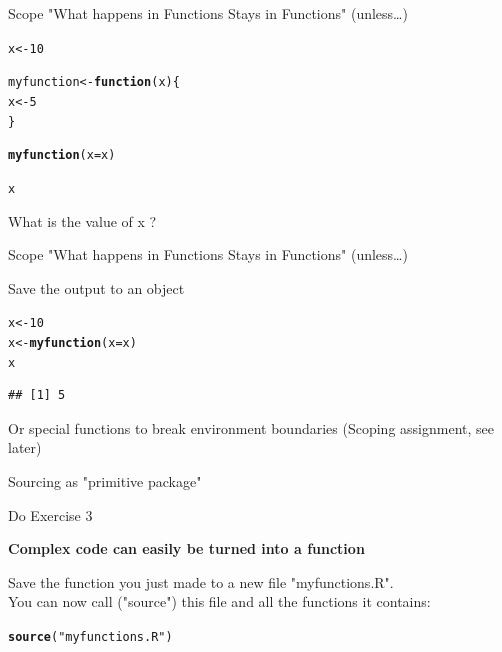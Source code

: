 \documentclass{beamer}\usepackage[]{graphicx}\usepackage[]{color}
\makeatletter
\newcommand{\hlnum}[1]{\textcolor[rgb]{0.686,0.059,0.569}{#1}}%
\newcommand{\hlstr}[1]{\textcolor[rgb]{0.192,0.494,0.8}{#1}}%
\newcommand{\hlstd}[1]{\textcolor[rgb]{0.345,0.345,0.345}{#1}}%
\newcommand{\hlkwa}[1]{\textcolor[rgb]{0.161,0.373,0.58}{\textbf{#1}}}%
\newcommand{\hlkwb}[1]{\textcolor[rgb]{0.69,0.353,0.396}{#1}}%
\newcommand{\hlkwc}[1]{\textcolor[rgb]{0.333,0.667,0.333}{#1}}%
\newcommand{\hlkwd}[1]{\textcolor[rgb]{0.737,0.353,0.396}{\textbf{#1}}}%
\newenvironment{kframe}{%
 \def\at@end@of@kframe{}%
 \ifinner\ifhmode%
  \def\at@end@of@kframe{\end{minipage}}%
  \begin{minipage}{\columnwidth}%
 \fi\fi%
 \def\FrameCommand##1{\hskip\@totalleftmargin \hskip-\fboxsep
 \colorbox{shadecolor}{##1}\hskip-\fboxsep
     \hskip-\linewidth \hskip-\@totalleftmargin \hskip\columnwidth}%
 \MakeFramed {\advance\hsize-\width
   \@totalleftmargin\z@ \linewidth\hsize
   \@setminipage}}%
 {\par\unskip\endMakeFramed%
 \at@end@of@kframe}
\newenvironment{knitrout}{}{} %
\makeatother
\begin{document}
\begin{frame}{Scope}
"What happens in Functions Stays in Functions" (unless\dots)

\begin{knitrout}
\color{fgcolor}\begin{kframe}
\begin{alltt}
\hlstd{x} \hlkwb{<-} \hlnum{10}

\hlstd{myfunction} \hlkwb{<-} \hlkwa{function}\hlstd{(}\hlkwc{x}\hlstd{)\{}
  \hlstd{x} \hlkwb{<-} \hlnum{5}
\hlstd{\}}

\hlkwd{myfunction}\hlstd{(}\hlkwc{x}\hlstd{=x)}

\hlstd{x}
\end{alltt}
\end{kframe}
\end{knitrout}
What is the value of x ?

\end{frame}


\begin{frame}[fragile]{Scope}
"What happens in Functions Stays in Functions" (unless\dots)

Save the output to an object
\begin{knitrout}
\color{fgcolor}\begin{kframe}
\begin{alltt}
\hlstd{x} \hlkwb{<-} \hlnum{10}
\hlstd{x} \hlkwb{<-} \hlkwd{myfunction}\hlstd{(}\hlkwc{x}\hlstd{=x)}
\hlstd{x}
\end{alltt}
\begin{verbatim}
## [1] 5
\end{verbatim}
\end{kframe}
\end{knitrout}

\pause

Or special functions to break environment boundaries (Scoping assignment, see later)

\end{frame}

\begin{frame}[fragile]{Sourcing as "primitive package"}

Do Exercise 3

\pause
\textbf{Complex code can easily be turned into a function}

\pause
\vfill
Save the function you just made to a new file "myfunctions.R".\\
You can now call ("source") this file and all the functions it contains: 
\begin{knitrout}
\color{fgcolor}\begin{kframe}
\begin{alltt}
\hlkwd{source}\hlstd{(}\hlstr{"myfunctions.R"}\hlstd{)}
\end{alltt}
\end{kframe}
\end{knitrout}


\end{frame}
\end{document}
